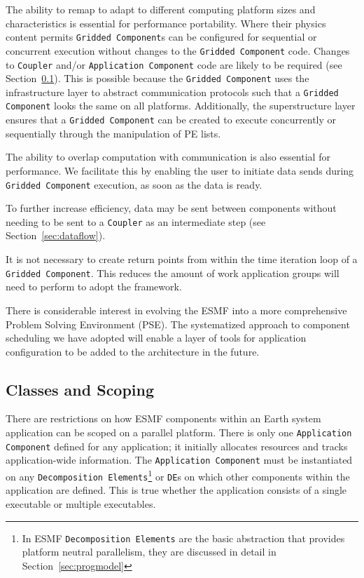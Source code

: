 The ability to remap to adapt to different computing platform sizes 
and characteristics is essential for performance portability.
Where their physics content permits
{\tt Gridded Component}s can be configured for
sequential or concurrent execution without changes to the {\tt Gridded 
Component} code.  Changes to {\tt Coupler} and/or {\tt Application Component} code are likely to 
be required (see Section~\ref{sec:scoping}). This is possible because 
the {\tt Gridded Component} uses the infrastructure layer to abstract communication
protocols such that a {\tt Gridded Component} looks the same on all
platforms. Additionally, the superstructure layer ensures that a {\tt Gridded
Component} can be created to execute concurrently or sequentially through the
manipulation of PE lists.

The ability to overlap computation with communication is also essential for
performance.  We facilitate this by enabling the user to initiate data 
sends during {\tt Gridded Component} execution, as soon as the data is ready.

To further increase efficiency, data may be sent between components without 
needing to be sent to a {\tt Coupler} as an intermediate step (see
Section~\ref{sec:dataflow}).

It is not necessary to create return points from 
within the time iteration loop of a {\tt Gridded Component}.  This reduces the
amount of work application groups will need to perform to adopt the 
framework.

There is considerable interest in evolving the ESMF into a more comprehensive
Problem Solving Environment (PSE).  The systematized approach to component 
scheduling we have adopted will enable a layer of tools for application 
configuration to be added to the architecture in the future.

\subsection{Classes and Scoping}
\label{sec:scoping}
There are restrictions on how ESMF components within an Earth system application 
can be scoped on a parallel platform.  There is only one {\tt Application Component} 
defined for any application; it initially allocates resources and tracks 
application-wide information. 
The {\tt Application Component} must be instantiated on 
any {\tt Decomposition Elements}\footnote{In ESMF {\tt Decomposition Elements} are the
basic abstraction that provides platform neutral parallelism, they are discussed in detail
in Section~\ref{sec:progmodel}} or {\tt DE}s on 
which other components
within the application are defined.  This is true whether the 
application consists of a single executable or multiple 
executables.  

